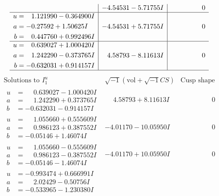 \documentclass[1p]{elsarticle_modified}
\theoremstyle{definition}
\newcommand{\I}{\sqrt{-1}}
\begin{document}
$$\begin{array}{c|c|c}
 & -4.54531 - 5.71755 I & \phantom{-0.000000 } 0 \\ \hline\begin{aligned}
u &= \phantom{-}1.121990 - 0.364900 I \\
a &= -0.27592 + 1.50625 I \\
b &= \phantom{-}0.447760 + 0.992496 I\end{aligned}
 & -4.54531 + 5.71755 I & \phantom{-0.000000 } 0 \\ \hline\begin{aligned}
u &= \phantom{-}0.639027 + 1.000420 I \\
a &= \phantom{-}1.242290 - 0.373765 I \\
b &= -0.632031 + 0.914157 I\end{aligned}
 & \phantom{-}4.58793 - 8.11613 I & \phantom{-0.000000 } 0\\
 \hline 
 \end{array}$$\newpage$$\begin{array}{c|c|c}  
\text{Solutions to }I^u_{1}& \I (\text{vol} + \sqrt{-1}CS) & \text{Cusp shape}\\
 \hline 
\begin{aligned}
u &= \phantom{-}0.639027 - 1.000420 I \\
a &= \phantom{-}1.242290 + 0.373765 I \\
b &= -0.632031 - 0.914157 I\end{aligned}
 & \phantom{-}4.58793 + 8.11613 I & \phantom{-0.000000 } 0 \\ \hline\begin{aligned}
u &= \phantom{-}1.055660 + 0.555609 I \\
a &= \phantom{-}0.986123 + 0.387552 I \\
b &= -0.05146 + 1.46074 I\end{aligned}
 & -4.01170 - 10.05950 I & \phantom{-0.000000 } 0 \\ \hline\begin{aligned}
u &= \phantom{-}1.055660 - 0.555609 I \\
a &= \phantom{-}0.986123 - 0.387552 I \\
b &= -0.05146 - 1.46074 I\end{aligned}
 & -4.01170 + 10.05950 I & \phantom{-0.000000 } 0 \\ \hline\begin{aligned}
u &= -0.993474 + 0.666991 I \\
a &= \phantom{-}2.02429 - 0.50756 I \\
b &= -0.533965 - 1.230380 I\end{aligned}

\end{array}$$
\end{document}
